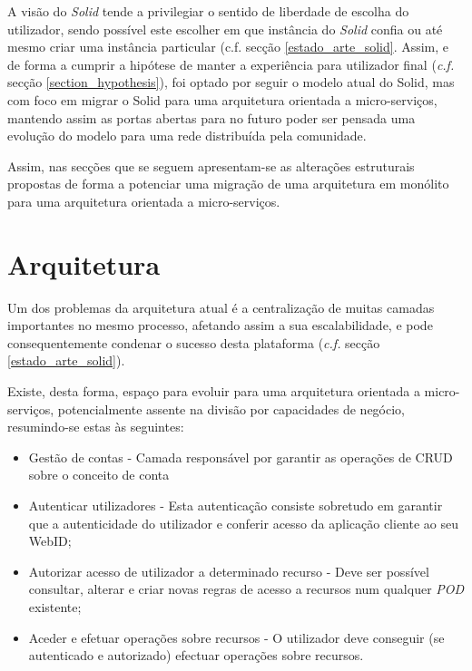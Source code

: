 A visão do \emph{Solid} tende a privilegiar o sentido de liberdade de escolha do utilizador, sendo possível este escolher em que instância do \emph{Solid} confia ou até mesmo criar uma instância particular ({c.f. secção \ref{estado_arte_solid}}. Assim, e 
de forma a cumprir a hipótese de manter a experiência para utilizador final (\emph{c.f.} secção \ref{section_hypothesis}), foi optado por seguir o modelo atual do Solid, mas com foco em migrar o Solid para uma arquitetura orientada a micro-serviços, mantendo assim as portas abertas para no futuro poder ser pensada uma evolução do modelo para uma rede distribuída pela comunidade.

Assim, nas secções que se seguem apresentam-se as alterações estruturais propostas de forma a potenciar uma migração de uma arquitetura em monólito para uma arquitetura orientada a micro-serviços.

\section{Arquitetura \label{section_arquitetura_proposta}}
Um dos problemas da arquitetura atual é a centralização de muitas camadas importantes no mesmo processo, afetando assim a sua escalabilidade, e pode consequentemente condenar o sucesso desta plataforma (\emph{c.f.} secção \ref{estado_arte_solid}).

Existe, desta forma, espaço para evoluir para uma arquitetura orientada a micro-serviços, potencialmente assente na divisão por capacidades de negócio, resumindo-se estas às seguintes:
\begin{itemize}
    \item Gestão de contas - Camada responsável por garantir as operações de CRUD sobre o conceito de conta
    \item  Autenticar utilizadores - Esta autenticação consiste sobretudo em garantir que a autenticidade do utilizador e conferir acesso da aplicação cliente ao seu WebID;
    \item Autorizar acesso de utilizador a determinado recurso - Deve ser possível consultar, alterar e criar novas regras de acesso a recursos num qualquer \emph{\acrshort{POD}} existente;
    \item Aceder e efetuar operações sobre recursos - O utilizador deve conseguir (se autenticado e autorizado) efectuar operações sobre recursos.
\end{itemize}


